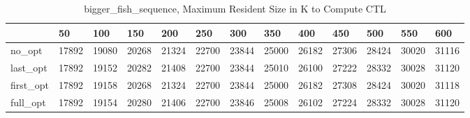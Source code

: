 \begin{table}
\caption{bigger\_fish\_sequence, Maximum Resident Size in K to Compute CTL}
\label{bigger_fish_sequence_CTL_size}
\begin{tabular}{lllllllllllll}
\toprule
 & 50 & 100 & 150 & 200 & 250 & 300 & 350 & 400 & 450 & 500 & 550 & 600 \\
\midrule
no\_opt & 17892 & 19080 & 20268 & 21324 & 22700 & 23844 & 25000 & 26182 & 27306 & 28424 & 30020 & 31116 \\
last\_opt & 17892 & 19152 & 20282 & 21408 & 22700 & 23844 & 25010 & 26100 & 27222 & 28332 & 30028 & 31120 \\
first\_opt & 17892 & 19158 & 20268 & 21324 & 22700 & 23844 & 25000 & 26182 & 27308 & 28424 & 30020 & 31118 \\
full\_opt & 17892 & 19154 & 20280 & 21406 & 22700 & 23846 & 25008 & 26102 & 27224 & 28332 & 30028 & 31120 \\
\bottomrule
\end{tabular}
\end{table}

